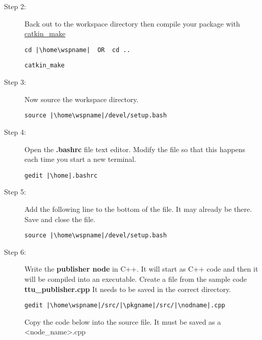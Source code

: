 \documentclass[12pt]{article}
\newcommand{\R}{\color{red}}
\newcommand{\K}{\color{black}}
\newcommand{\G}{\color{mygreen}}
\newcommand{\PR}{\color{mypurple}}
\newcommand{\pkgname}{\G<package\_name>\K}
\newcommand{\wspname}{\R<workspace\_name>\K}
\newcommand{\nodname}{\PR<node\_name>\K}
\newcommand{\home}{\textasciitilde/}
\begin{document}
\begin{itemize}
\begin{description}
            
            
\item [Step 2:] Back out to the workspace directory then compile your package with \href{http://wiki.ros.org/catkin/Tutorials/using_a_workspace#Building_Packages_in_a_catkin_Workspace}{catkin\_make} 

\begin{verbatim}  
cd |\home\wspname| 	OR 	cd ..
\end{verbatim}
             
\begin{verbatim}  
catkin_make
\end{verbatim}
            
 \item [Step 3:]  Now source the workspace directory.
\begin{verbatim}   
source |\home\wspname|/devel/setup.bash
\end{verbatim}

\item[Step 4:]  Open the {\bf .bashrc} file text editor. Modify the file so that this happens 
each time you start a new terminal. 
			
\begin{verbatim}  
gedit |\home|.bashrc
\end{verbatim}

\item [Step 5:] Add the following line to the bottom of the file. It may already be there. Save and close the file.		
						
\begin{verbatim} 
source |\home\wspname|/devel/setup.bash
\end{verbatim}
            
            
     
\newpage
\item [Step 6:] Write the {\bf publisher node} in C++. It will start as C++ code and then it will be compiled into an executable. Create a file from the sample code {\bf ttu\_publisher.cpp} It needs to be saved in the correct directory.

\begin{verbatim}  
gedit |\home\wspname|/src/|\pkgname|/src/|\nodname|.cpp
\end{verbatim}
  
 Copy the code below into the source file. It must be saved as a \nodname.cpp \\


\end{description}
\end{itemize}
\end{document}
